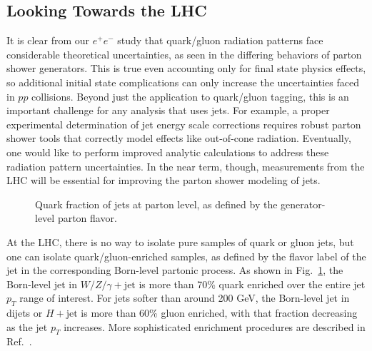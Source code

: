 \documentclass[11pt]{cernrep}
\begin{document}
\subsection{Looking Towards the LHC}
\label{quarkgluon_sec:pp}

It is clear from our $e^+e^-$ study that quark/gluon radiation patterns face considerable theoretical uncertainties, as seen in the differing behaviors of parton shower generators.  This is true even accounting only for final state physics effects, so additional initial state complications can only increase the uncertainties faced in $pp$ collisions.  Beyond just the application to quark/gluon tagging, this is an important challenge for any analysis that uses jets.  For example, a proper experimental determination of jet energy scale corrections requires robust parton shower tools that correctly model effects like out-of-cone radiation.  Eventually, one would like to perform improved analytic calculations to address these radiation pattern uncertainties.  In the near term, though, measurements from the LHC will be essential for improving the parton shower modeling of jets.

\begin{figure}
\centering
{}
\caption{Quark fraction of jets at parton level, as defined by the generator-level parton flavor.}
\label{quarkgluon_fig:parton_level_qg_composition}
\end{figure}

At the LHC, there is no way to isolate pure samples of quark or gluon jets, but one can isolate quark/gluon-enriched samples, as defined by the flavor label of the jet in the corresponding Born-level partonic process.  As shown in Fig.~\ref{quarkgluon_fig:parton_level_qg_composition}, the Born-level jet in $W/Z/\gamma + \text{jet}$ is more than 70\% quark enriched over the entire jet $p_T$ range of interest.  For jets softer than around 200 GeV, the Born-level jet in dijets or $H+\text{jet}$ is more than 60\% gluon enriched, with that fraction decreasing as the jet $p_T$ increases.  More sophisticated enrichment procedures are described in Ref.~\cite{Gallicchio:2011xc}.
\end{document}

